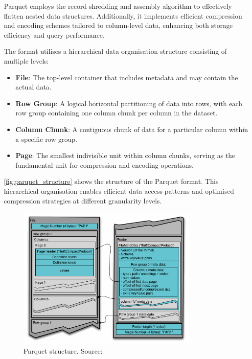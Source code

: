 Parquet employs the record shredding and assembly algorithm \citep{dremel_2010} to effectively flatten nested data structures.
Additionally, it implements efficient compression and encoding schemes tailored to column-level data, enhancing both storage efficiency and query performance.

The format utilises a hierarchical data organisation structure consisting of multiple levels:
\begin{itemize}
  \item \textbf{File}: The top-level container that includes metadata and may contain the actual data.
  \item \textbf{Row Group}: A logical horizontal partitioning of data into rows, with each row group containing one column chunk per column in the dataset.
  \item \textbf{Column Chunk}: A contiguous chunk of data for a particular column within a specific row group.
  \item \textbf{Page}: The smallest indivisible unit within column chunks, serving as the fundamental unit for compression and encoding operations.
\end{itemize}

\autoref{fig:parquet_structure} shows the structure of the Parquet format.
This hierarchical organisation enables efficient data access patterns and optimised compression strategies at different granularity levels.

\begin{figure}[htbp]
  \centering
  \includegraphics[width=0.8\textwidth]{figs/related_work_theoretical_bg/parquet_structure.png}
  \caption[Parquet Structure]{Parquet structure. Source: \citet{parquet}}
  \label{fig:parquet_structure}
\end{figure}

